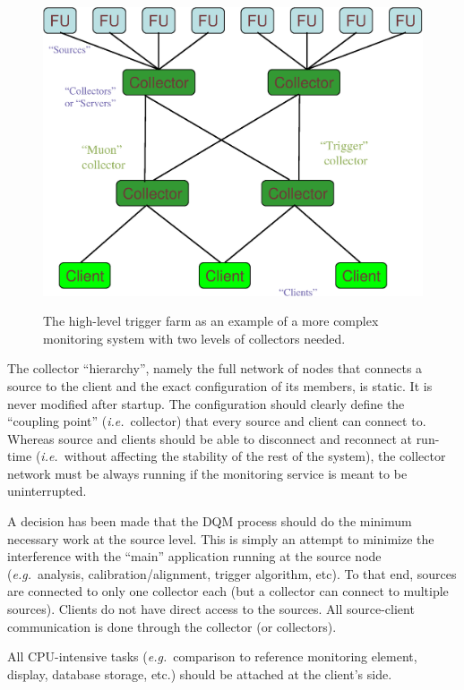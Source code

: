 \documentclass{cmspaper}
\newcommand {\ie}{\mbox{\sl i.e. }}     %
\newcommand {\eg}{\mbox{\sl e.g. }}     %
\begin{document}
\begin{figure}[hbtp]
  \begin{center}
    \resizebox{13cm}{!}
	{\includegraphics{figures/multiple_collectors.eps}} 
\caption{The high-level trigger farm as an example of a more complex monitoring
system with two levels of collectors needed.}
\label{fig:multiple_collectors}
  \end{center}
\end{figure}
%
The collector ``hierarchy'', namely the full network of nodes that connects a
source to the client and the exact configuration of its members, is
static. It is never modified after startup. The configuration should
clearly define the ``coupling point'' (\ie collector) that  every
source and client can connect to. Whereas source and clients should be
able to disconnect and reconnect at run-time (\ie without affecting the
stability of the rest of the system), the collector network
must be always running if the monitoring service is meant to be uninterrupted.

A decision has been made that the DQM process should do the minimum
necessary work at the source level. This is simply an attempt to minimize the
interference with the ``main'' application running at the source
node (\eg analysis, calibration/alignment, trigger algorithm,
etc). To that end, sources are connected to only one collector each
(but a collector can connect to multiple sources). Clients do not have
direct access to the sources. All source-client communication is done
through the collector (or collectors). 

All CPU-intensive tasks (\eg comparison to reference monitoring
element, display, database storage, etc.) should be attached at the client's
side. 
\end{document}
